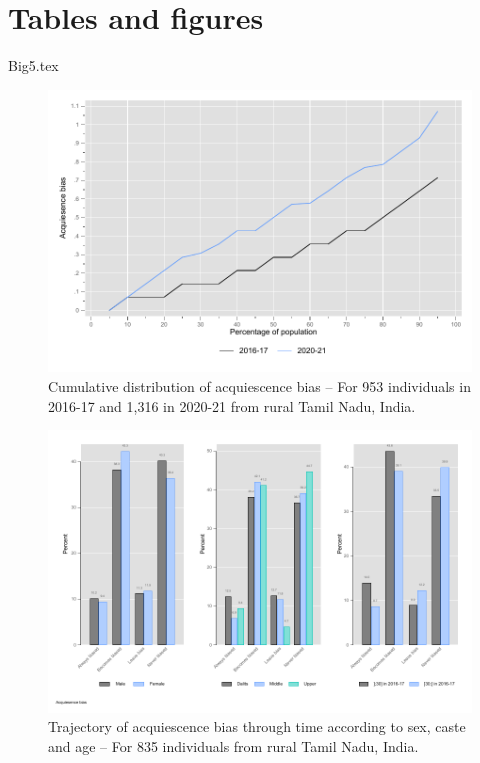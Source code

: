 \documentclass[a4paper, 12pt, onecolumn]{article}
\begin{document}
\clearpage
\newpage
\section*{Tables and figures}


{Big5.tex}

\begin{figure}[!h]
\raggedright
\includegraphics[scale=0.8]{INPUT/curve_ars}
\caption{Cumulative distribution of acquiescence bias -- For 953 individuals in 2016-17 and 1,316 in 2020-21 from rural Tamil Nadu, India.}
\label{fig:curvears}
\end{figure}

\begin{figure}[!h]
\raggedright
\includegraphics[scale=0.8]{INPUT/path_ars}
\caption{Trajectory of acquiescence bias through time according to sex, caste and age -- For 835 individuals from rural Tamil Nadu, India.}
\label{fig:arssub}
\end{figure}
\end{document}
